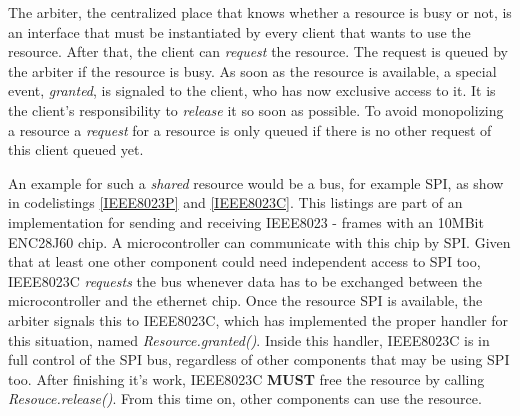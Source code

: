 The arbiter, the centralized place that knows whether a resource is busy or not, is an interface that must be instantiated by every client that wants to use the resource. After that, the client can \textit{request} the resource. The request is queued by the arbiter if the resource is busy. As soon as the resource is available, a special event, \textit{granted}, is signaled to the client, who has now exclusive access to it. It is the client's responsibility to \textit{release} it so soon as possible.
To avoid monopolizing a resource a \textit{request} for a resource is only queued if there is no other request of this client queued yet.

An example for such a \textit{shared} resource would be a bus, for example SPI, as show in codelistings \ref{IEEE8023P} and \ref{IEEE8023C}. This listings are part of an implementation for sending and receiving IEEE8023 - frames with an 10MBit ENC28J60 chip. A microcontroller can communicate with this chip by SPI. Given that at least one other component could need independent access to SPI too, IEEE8023C \textit{requests} the bus whenever data has to be exchanged between the microcontroller and the ethernet chip. Once the resource SPI is available, the arbiter signals this to IEEE8023C, which has implemented the proper handler for this situation, named \textit{Resource.granted()}. Inside this handler, IEEE8023C is in full control of the SPI bus, regardless of other components that may be using SPI too. After finishing it's work, IEEE8023C \textbf{MUST} free the resource by calling \textit{Resouce.release()}. From this time on, other components can use the resource.





